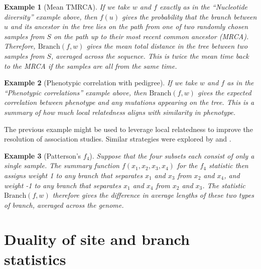 \documentclass[9pt,twoside,lineno]{gsajnl}
\newtheorem{example}{Example}
\newcommand{\branch}{\mbox{Branch}} %
\newcommand{\iw}{w} %
\begin{document}
\begin{example}[Mean TMRCA] \label{ex:branch_diversity}
    If we take $\iw$ and $f$ exactly as in the ``Nucleotide diversity'' example above,
    then $f(u)$ gives the probability that the branch between $u$ and its ancestor in the tree
    lies on the path from one of two randomly chosen samples from $S$
    on the path up to their most recent common ancestor (MRCA).
    Therefore, $\branch(f, \iw)$
    gives the mean total distance in the tree between two samples from $S$,
    averaged across the sequence.
    This is twice the mean time back to the MRCA if the samples are all from the same time.
\end{example}

\begin{example}[Phenotypic correlation with pedigree] \label{ex:branch_correlation}
    If we take $\iw$ and $f$ as in the ``Phenotypic correlations'' example above,
    then $\branch(f, \iw)$ gives the \emph{expected} correlation between phenotype and any mutations
    appearing on the tree. This is a summary of how much local relatedness
    aligns with similarity in phenotype.
\end{example}

The previous example might be used to leverage local relatedness
to improve the resolution of association studies.
Similar strategies were explored by \citet{zollner2005coalescent} and \citet{minichiello2006mapping}.

\begin{example}[Patterson's $f_4$] \label{ex:branch_f4}
    Suppose that the four subsets each consist of only a single sample.
    The summary function $f(x_1, x_2, x_3, x_4)$ for the $f_4$ statistic
    then assigns weight 1 to any branch that separates $x_1$ and $x_3$ from $x_2$ and $x_4$,
    and weight -1 to any branch that separates $x_1$ and $x_4$ from $x_2$ and $x_3$.
    The statistic $\branch(f, \iw)$ therefore
    gives the difference in average lengths of these two types of branch,
    averaged across the genome.
\end{example}



\section*{Duality of site and branch statistics}
\end{document}
